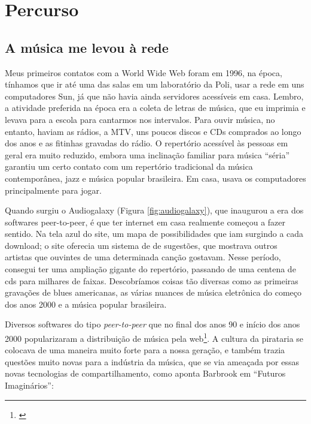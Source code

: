 
\chapter{Percurso}
\label{ch:percurso}


\section{A música me levou à rede}
    
Meus primeiros contatos com a World Wide Web foram em 1996, na época, tínhamos que ir até uma das salas em um laboratório da Poli, usar a rede em uns computadores Sun, já que não havia ainda servidores acessíveis em casa. Lembro, a atividade preferida na época era a coleta de letras de música, que eu imprimia e levava para a escola para cantarmos nos intervalos. Para ouvir música, no entanto, haviam as rádios, a MTV, uns poucos discos e CDs comprados ao longo dos anos e as fitinhas gravadas do rádio. O repertório acessível às pessoas em geral era muito reduzido, embora uma inclinação familiar para música ``séria'' garantiu um certo contato com um repertório tradicional da música contemporânea, jazz e música popular brasileira. Em casa, usava os computadores principalmente para jogar.

Quando surgiu o Audiogalaxy (Figura \ref{fig:audiogalaxy}), que inaugurou a era dos softwares peer-to-peer, é que ter internet em casa realmente começou a fazer sentido. Na tela azul do site, um mapa de possibilidades que iam surgindo a cada download; o site oferecia um sistema de de sugestões, que mostrava outros artistas que ouvintes de uma determinada canção gostavam. Nesse período, consegui ter uma ampliação gigante do repertório, passando de uma centena de cds para milhares de faixas. Descobríamos coisas tão diversas como as primeiras gravações de blues americanas, as várias nuances de música eletrônica do começo dos anos 2000 e a música popular brasileira. 

Diversos softwares do tipo \emph{peer-to-peer} que no final dos anos 90 e início dos anos 2000 popularizaram a distribuição de música pela web\footnote{\cite{Castro2008}}.  A cultura da pirataria se colocava de uma maneira muito forte para a nossa geração, e também trazia questões muito novas para a indústria da música, que se via ameaçada por essas novas tecnologias de compartilhamento, como aponta Barbrook em ``Futuros Imaginários'':
    
